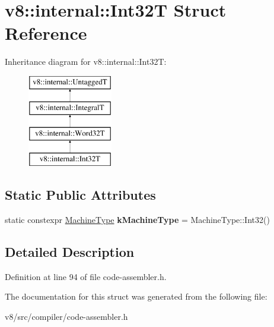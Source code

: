 \hypertarget{structv8_1_1internal_1_1Int32T}{}\section{v8\+:\+:internal\+:\+:Int32T Struct Reference}
\label{structv8_1_1internal_1_1Int32T}
Inheritance diagram for v8\+:\+:internal\+:\+:Int32T\+:\begin{figure}[H]
\begin{center}
\leavevmode
\includegraphics[height=4.000000cm]{structv8_1_1internal_1_1Int32T}
\end{center}
\end{figure}
\subsection*{Static Public Attributes}
\begin{DoxyCompactItemize}
\item 
\mbox{\label{structv8_1_1internal_1_1Int32T_ad10a9a042f559f458ed960d5af035c16}} 
static constexpr \mbox{\hyperlink{classv8_1_1internal_1_1MachineType}{Machine\+Type}} {\bfseries k\+Machine\+Type} = Machine\+Type\+::\+Int32()
\end{DoxyCompactItemize}


\subsection{Detailed Description}


Definition at line 94 of file code-\/assembler.\+h.



The documentation for this struct was generated from the following file\+:\begin{DoxyCompactItemize}
\item 
v8/src/compiler/code-\/assembler.\+h\end{DoxyCompactItemize}
